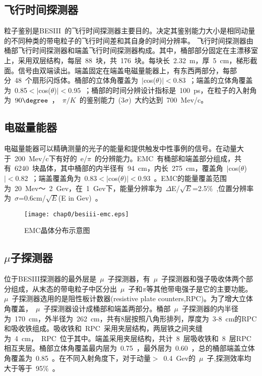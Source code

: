 \subsection{飞行时间探测器}
粒子鉴别是BESIII~的飞行时间探测器主要目的。决定其鉴别能力大小是相同动量的不同种类的带电粒子的飞行时间差和其自身的时间分辨率。
飞行时间探测器由桶部飞行时间探测器和端盖飞行时间探测器构成。其中，桶部部分固定在主漂移室上，采用双层结构，每层~88~块，共~176~块。每块长~2.32~m，厚~5~cm，梯形截面。信号由双端读出。端盖固定在端盖电磁量能器上，有东西两部分，每部分~48~个扇形闪烁体。桶部的立体角覆盖为~$|$cos($\theta$)$|<$0.83~；端盖的立体角覆盖为~0.85$<|$cos($\theta$)$|<$0.95~；桶部的时间分辨设计指标是~100~ps，在粒子的入射角为~$90\degree$~，~$\pi/K$~的鉴别能力~(3$\sigma$)~大约达到~700~Mev/c。

\subsection{电磁量能器}

电磁量能器可以精确测量的光子的能量和提供触发中性事例的信号。在动量大于~200~Mev/c下有好的~e/$\pi$~的分辨能力。EMC~有桶部和端盖部分组成，共有~6240~块晶体，其中桶部的内半径有~94~cm，内长~275~cm，覆盖角~$|$cos($\theta$)$|<$0.82~；端盖覆盖角为~0.83$<|$cos($\theta$)$|<$0.93~。EMC的能量覆盖范围为~20~Mev～~2~Gev，在~1~Gev下，能量分辨率为~$\Delta$E/$\sqrt E$=2.5$\%$~,位置分辨率为~$\sigma$=0.6cm/$\sqrt E$(E in Gev)~。
\begin{figure}[!h]
  \centering
  \texttt{[image: chap0/besiii-emc.eps]}
  \caption{EMC晶体分布示意图}
  \label{fig:besiii-emc}
\end{figure}

\subsection{$\mu$子探测器}

位于BESIII探测器的最外层是~$\mu$~子探测器，有~$\mu$~子探测器和强子吸收体两个部分组成，从末态的带电粒子中区分出~$\mu$~子和$\pi$等其他带电强子是它的主要功能。~$\mu$~子探测器选用的是阻性板计数器(resistive plate counters,RPC)。为了增大立体角覆盖，~$\mu$~子探测器设计成桶部和端盖两部分。桶部~$\mu$~子探测器的内半径为~170~cm，外半径为~262~cm，共有8层按照八角形排列，厚度为~3-8~cm的RPC和吸收铁组成。吸收铁和~RPC~采用夹层结构，两层铁之间夹缝为~4~cm，~RPC~位于其中。端盖采用夹层结构，共计~8~层吸收铁和~8~层RPC相互夹层。桶部立体角覆盖最内层为~0.75~，最外层为~0.60~，总的桶部端盖立体角覆盖为~0.85~。在不同入射角度下，对于动量$>$~0.4~Gev的~$\mu$~子,探测效率均大于等于~95$\%$~。


